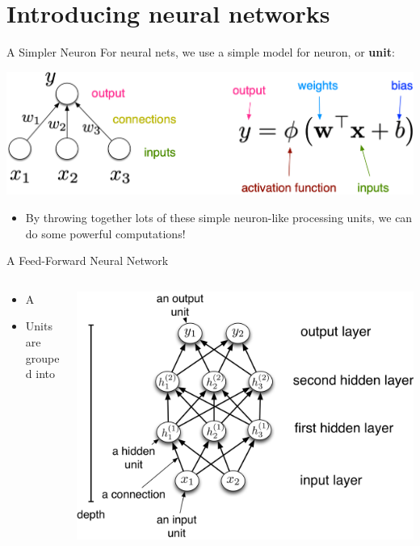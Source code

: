 \documentclass[handout,aspectratio=169]{beamer}
\begin{document}
\section{Introducing neural networks}


\begin{frame}{A Simpler Neuron}
For neural nets, we use a simple model for neuron, or \textbf{unit}:

    \begin{center}
      \includegraphics[width=0.8 \textwidth]{pics/neuron2}
    \end{center}
\pause
  \begin{itemize}

  \item By throwing together lots of these simple neuron-like processing units, we can do some powerful computations!
  \end{itemize}
\end{frame}



\begin{frame}{A Feed-Forward Neural Network}
\vspace{5mm}
  \begin{columns}
    \begin{column}{0.45 \linewidth}
      \begin{itemize}
      \item A 
      \item Units are grouped into 
      \end{itemize}
    \end{column}
    \begin{column}{0.65 \linewidth}
      \includegraphics[width=\linewidth]{pics/mlp.png}
    \end{column}
  \end{columns}
\end{frame}
\end{document}
